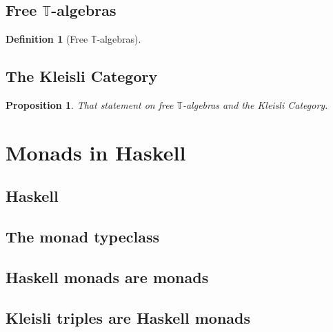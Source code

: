 \documentclass[a4paper]{article}
\theoremstyle{plain}
\newtheorem{proposition}[theorem]{Proposition}
\theoremstyle{definition}
\newtheorem{definition}[theorem]{Definition}
\begin{document}
\subsection{Free \texorpdfstring{$\mathbb{T}$}{T}-algebras}
\begin{definition}[Free $\mathbb{T}$-algebras]
\end{definition}
\subsection{The Kleisli Category}
\begin{proposition}
    That statement on free $\mathbb{T}$-algebras and the Kleisli Category.
\end{proposition}

\section{Monads in Haskell}
\subsection{Haskell}
\subsection{The monad typeclass}
\subsection{Haskell monads are monads}
\subsection{Kleisli triples are Haskell monads}
\end{document}
